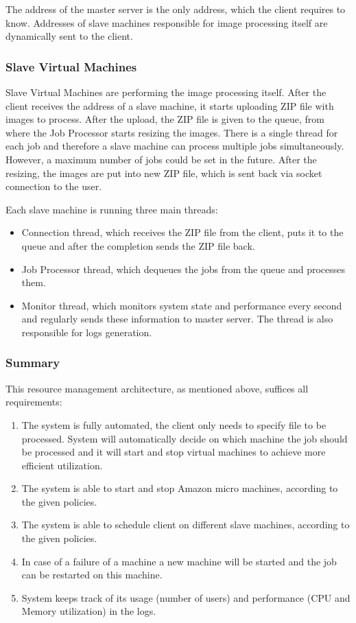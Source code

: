 The address of the master server is the only address, which the client requires to know. Addresses of slave machines responsible for image processing itself are dynamically sent to the client.

\subsubsection{Slave Virtual Machines}
Slave Virtual Machines are performing the image processing itself. After the client receives the address of a slave machine, it starts uploading ZIP file with images to process. After the upload, the ZIP file is given to the queue, from where the Job Processor starts resizing the images. There is a single thread for each job and therefore a slave machine can process multiple jobs simultaneously. However, a maximum number of jobs could be set in the future. %
After the resizing, the images are put into new ZIP file, which is sent back via socket connection to the user.

Each slave machine is running three main threads:
\begin{itemize}
 \item Connection thread, which receives the ZIP file from the client, puts it to the queue and after the completion sends the ZIP file back.
 \item Job Processor thread, which dequeues the jobs from the queue and processes them.
 \item Monitor thread, which monitors system state and performance every second and regularly sends these information to master server. The thread is also responsible for logs generation.
\end{itemize}

\subsubsection{Summary}
This resource management architecture, as mentioned above, suffices all requirements:
\begin{enumerate}
 \item The system is fully automated, the client only needs to specify file to be processed. System will automatically decide on which machine the job should be processed and it will start and stop virtual machines to achieve more efficient utilization.
 \item The system is able to start and stop Amazon micro machines, according to the given policies.
 \item The system is able to schedule client on different slave machines, according to the given policies.
 \item In case of a failure of a machine a new machine will be started and the job can be restarted on this machine.
 \item System keeps track of its usage (number of users) and performance (CPU and Memory utilization) in the logs.
\end{enumerate}

